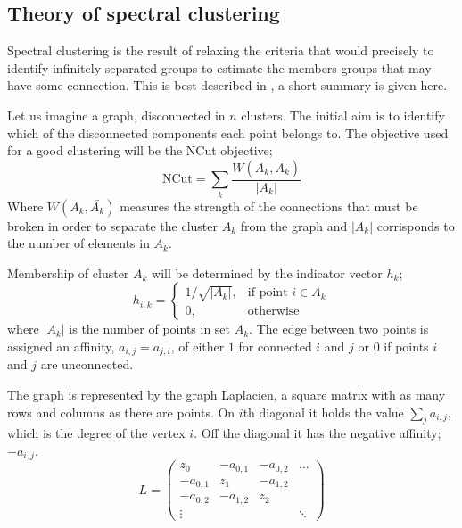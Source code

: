 \subsection{Theory of spectral clustering}\label{sec:spectral_theory}


Spectral clustering is the result of relaxing the criteria that would precisely
to identify infinitely separated groups to estimate the members  groups that may have some connection.
This is best described in \cite{luxburg2007spectraltutorial}, a short summary is given here.

Let us imagine a graph, disconnected in \(n\) clusters.
The initial aim is to identify which of the disconnected components each point belongs to.
The objective used for a good clustering will be the NCut objective;
\begin{equation}
    \text{NCut} = \sum_k\frac{W(A_k, \bar{A_k})}{|A_k|}
\end{equation}
Where \(W(A_k, \bar{A_k})\) measures the strength of the connections that must be
broken in order to separate the cluster \(A_k\) from the graph
and \(|A_k|\) corrisponds to the number of elements in \(A_k\).

Membership of cluster \(A_k\) will be determined by the indicator vector \(h_k\);
\begin{equation}
    h_{i, k}= 
    \begin{cases}
        1/\sqrt{|A_k|},& \text{if point } i \in A_k \\
        0,              & \text{otherwise}
    \end{cases}
\end{equation}
where \(|A_k|\) is the number of points in set \(A_k\).
The edge between two points is assigned an affinity, \(a_{i,j} = a_{j, i}\),
of either \(1\) for connected \(i\) and \(j\) or \(0\) 
if points \(i\) and \(j\) are unconnected.

The graph is represented by the graph Laplacien, a square
matrix with as many rows and columns as there are points.
On \(i\)th diagonal it holds the value \(\sum_j a_{i, j}\),
which is the degree of the vertex \(i\).
Off the diagonal it has the negative affinity; \(-a_{i, j}\).
\begin{equation}
    L = 
    \begin{pmatrix}
        z_0 & -a_{0,1} & -a_{0,2} & \hdots \\
        -a_{0,1} & z_1 & -a_{1,2} & \\
        -a_{0,2} & -a_{1,2} & z_2 & \\
        \vdots   &          &     & \ddots 
    \end{pmatrix}
\end{equation}

